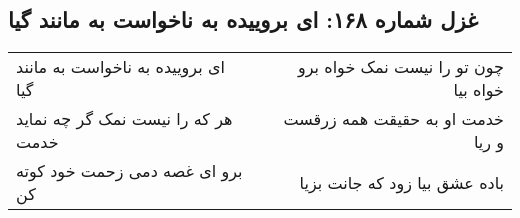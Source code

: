 \begin{center}
\section*{غزل شماره ۱۶۸: ای بروییده به ناخواست به مانند گیا}
\label{sec:0168}
\begin{longtable}{l p{0.5cm} r}
ای بروییده به ناخواست به مانند گیا
&&
چون تو را نیست نمک خواه برو خواه بیا
\\
هر که را نیست نمک گر چه نماید خدمت
&&
خدمت او به حقیقت همه زرقست و ریا
\\
برو ای غصه دمی زحمت خود کوته کن
&&
باده عشق بیا زود که جانت بزیا
\\
\end{longtable}
\end{center}
